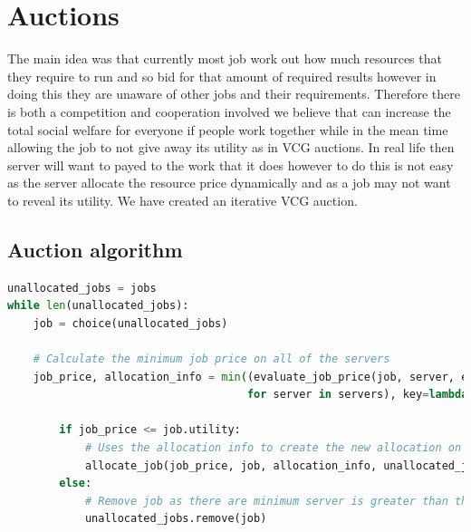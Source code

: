 \documentclass[fleqn]{article}
\begin{document}
\section{Auctions}\label{sec:auction-idea}
The main idea was that currently most job work out how much resources that they require to run and so bid for that amount of required results however in doing this they are unaware of other jobs and their requirements. Therefore there is both a competition and cooperation involved we believe that can increase the total social welfare for everyone if people work together while in the mean time allowing the job to not give away its utility as in VCG auctions.
In real life then server will want to payed to the work that it does however to do this is not easy as the server allocate the resource price dynamically and as a job may not want to reveal its utility.
We have created an iterative VCG auction.

\subsection{Auction algorithm}\label{subsec:auction-algorithm}
\begin{lstlisting}[language=Python]
unallocated_jobs = jobs
while len(unallocated_jobs):
    job = choice(unallocated_jobs)

    # Calculate the minimum job price on all of the servers
    job_price, allocation_info = min((evaluate_job_price(job, server, epsilon=epsilon)
                                     for server in servers), key=lambda bid: bid[0])

        if job_price <= job.utility:
            # Uses the allocation info to create the new allocation on the selected server
            allocate_job(job_price, job, allocation_info, unallocated_jobs)
        else:
            # Remove job as there are minimum server is greater than the job's utility
            unallocated_jobs.remove(job)
\end{lstlisting}
\end{document}
